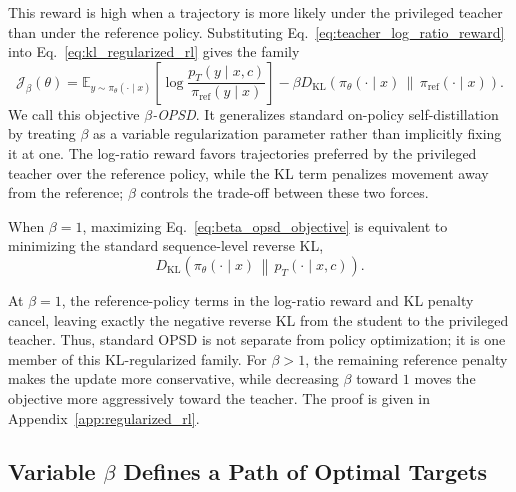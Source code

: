 This reward is high when a trajectory is more likely under the privileged teacher than under
the reference policy. Substituting Eq.~\ref{eq:teacher_log_ratio_reward} into
Eq.~\ref{eq:kl_regularized_rl} gives the family
\begin{equation}
    \mathcal{J}_{\beta}(\theta)
    =
    \mathbb{E}_{y\sim\pi_\theta(\cdot\mid x)}
    \left[
    \log
    \frac{
    p_T(y\mid x,c)
    }{
    \pi_{\mathrm{ref}}(y\mid x)
    }
    \right]
    -
    \beta
    D_{\mathrm{KL}}
    \left(
    \pi_\theta(\cdot\mid x)
    \,\middle\|\,
    \pi_{\mathrm{ref}}(\cdot\mid x)
    \right).
    \label{eq:beta_opsd_objective}
\end{equation}
We call this objective \emph{$\beta$-OPSD}. It generalizes standard on-policy
self-distillation by treating $\beta$ as a variable regularization parameter rather than
implicitly fixing it at one.
The log-ratio reward favors trajectories preferred by the privileged teacher over the
reference policy, while the KL term penalizes movement away from the reference; $\beta$
controls the trade-off between these two forces.

\begin{proposition}[OPSD is the $\beta=1$ case]
\label{prop:opsd_beta_one}
When $\beta=1$, maximizing Eq.~\ref{eq:beta_opsd_objective} is equivalent to minimizing
the standard sequence-level reverse KL,
\begin{equation}
    D_{\mathrm{KL}}
    \left(
    \pi_\theta(\cdot\mid x)
    \,\middle\|\,
    p_T(\cdot\mid x,c)
    \right).
    \label{eq:standard_opsd_kl}
\end{equation}
\end{proposition}

At $\beta=1$, the reference-policy terms in the log-ratio reward and KL penalty cancel,
leaving exactly the negative reverse KL from the student to the privileged teacher. Thus,
standard OPSD is not separate from policy optimization; it is one member of this
KL-regularized family. For $\beta>1$, the remaining reference penalty makes the update
more conservative, while decreasing $\beta$ toward $1$ moves the objective more
aggressively toward the teacher. The proof is given in Appendix~\ref{app:regularized_rl}.

\subsection{Variable \texorpdfstring{$\beta$}{beta} Defines a Path of Optimal Targets}
\label{sec:optimal_policy_interpolant}


